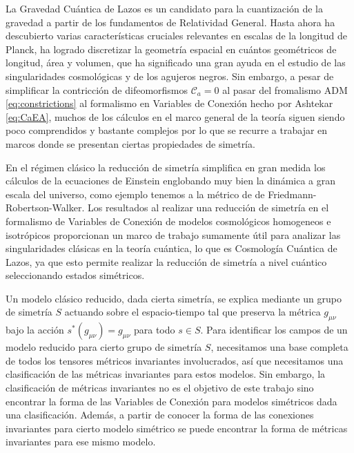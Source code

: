 La Gravedad Cu\'{a}ntica de Lazos es un candidato para la cuantizaci\'{o}n de la gravedad a partir de los fundamentos de Relatividad General. Hasta ahora ha descubierto varias caracter\'{i}sticas cruciales relevantes en escalas de la longitud de Planck, ha logrado discretizar la geometr\'{i}a espacial en cu\'{a}ntos geom\'{e}tricos de longitud, \'{a}rea y volumen, que ha significado una gran ayuda en el estudio de las singularidades cosmol\'{o}gicas y de los agujeros negros. Sin embargo, a pesar de simplificar la contricci\'{o}n de difeomorfismos $\mathcal{C}_{a} = 0$ al pasar del fromalismo ADM \eqref{eq:constrictions} al formalismo en Variables de Conexi\'{o}n hecho por Ashtekar \eqref{eq:CaEA}, muchos de los c\'{a}lculos en el marco general de la teor\'{i}a siguen siendo poco comprendidos y bastante complejos por lo que se recurre a trabajar en marcos donde se presentan ciertas propiedades de simetr\'{i}a.

En el r\'{e}gimen cl\'{a}sico la reducci\'{o}n de simetr\'{i}a simplifica en gran medida los c\'{a}lculos de la ecuaciones de Einstein englobando muy bien la din\'{a}mica a gran escala del universo, como ejemplo tenemos a la m\'{e}trico de de Friedmann-Robertson-Walker. Los resultados al realizar una reducci\'{o}n de simetr\'{i}a en el formalismo de Variables de Conexi\'{o}n de modelos cosmol\'{o}gicos homogeneos e isotr\'{o}picos proporcionan un marco de trabajo sumamente \'{u}til para analizar las singularidades cl\'{a}sicas en la teor\'{i}a cu\'{a}ntica, lo que es Cosmolog\'{i}a Cu\'{a}ntica de Lazos, ya que esto permite realizar la reducci\'{o}n de simetr\'{i}a a nivel cu\'{a}ntico seleccionando estados sim\'{e}tricos.

Un modelo cl\'{a}sico reducido, dada cierta simetr\'{i}a, se explica mediante un grupo de simetr\'{i}a $S$ actuando sobre el espacio-tiempo tal que preserva la m\'{e}trica $g_{\mu \nu}$ bajo la acci\'{o}n $s^{*}(g_{\mu \nu}) = g_{\mu \nu}$ para todo $s \in S$. Para identificar los campos de un modelo reducido para cierto grupo de simetr\'{i}a $S$, necesitamos una base completa de todos los tensores m\'{e}tricos invariantes involucrados, as\'{i} que necesitamos una clasificaci\'{o}n de las m\'{e}tricas invariantes para estos modelos. Sin embargo, la clasificaci\'{o}n de m\'{e}tricas invariantes no es el objetivo de este trabajo sino encontrar la forma de las Variables de Conexi\'{o}n para modelos sim\'{e}tricos dada una clasificaci\'{o}n. Adem\'{a}s, a partir de conocer la forma de las conexiones invariantes para cierto modelo sim\'{e}trico se puede encontrar la forma de m\'{e}tricas invariantes para ese mismo modelo.

